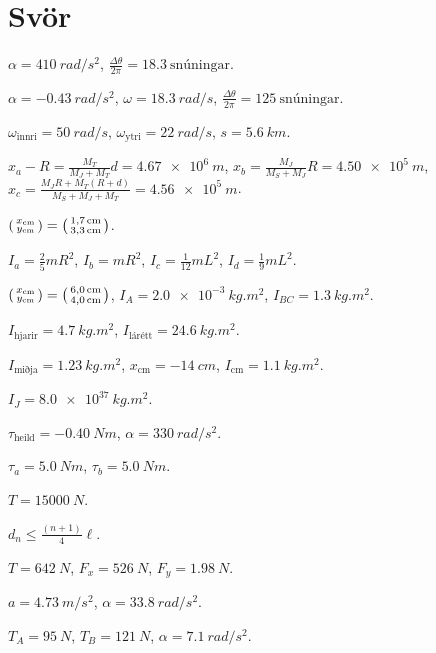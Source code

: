\ifdefined \wholebook \else\documentclass[oneside]{book}\usepackage{EdlBook}\graphicspath{{figures/}}
\begin{document}
\section*{Svör}

\begin{enumerate*}[label = \vspace{0.15cm} \textbf{(\arabic*)}]
  \item $\alpha = \SI{410}{rad/s^2}$, $\frac{\Delta \theta}{2\pi} = \SI{18.3}{\text{snúningar}}$.
  \item $\alpha = \SI{-0.43}{rad/s^2}$, $\omega = \SI{18.3}{rad/s}$, $\frac{\Delta \theta}{2\pi} = \SI{125}{\text{snúningar}}$.
  \item $\omega_{\text{innri}} = \SI{50}{rad/s}$, $\omega_{\text{ytri}} = \SI{22}{rad/s}$, $s = \SI{5.6}{km}$.
  \item $x_a - R = \frac{M_T}{M_J + M_T}d = \SI{4.67e6}{m}$, $x_b = \frac{M_J}{M_S + M_J}R = \SI{4.50e5}{m}$, $x_c = \frac{M_J R + M_T (R+d)}{M_S + M_J + M_T} = \SI{4.56e5}{m}$.
  \item $\smqty(x_{\text{cm}} \\ y_{\text{cm}}) = \smqty(\SI{1.7}{cm} \\ \SI{3.3}{cm})$. \item $I_a = \frac{2}{5}mR^2$, $I_b = mR^2$, $I_c = \frac{1}{12}mL^2$, $I_d = \frac{1}{9}mL^2$.
  \item $\smqty(x_{\text{cm}} \\ y_{\text{cm}}) = \smqty(\SI{6.0}{cm} \\ \SI{4.0}{cm})$, $I_A = \SI{2.0e-3}{kg.m^2}$, $I_{BC} = \SI{1.3}{kg.m^2}$.
  \item $I_{\text{hjarir}} = \SI{4.7}{kg.m^2}$, $I_{\text{lárétt}} = \SI{24.6}{kg.m^2}$.
  \item $I_{\text{miðja}} = \SI{1.23}{kg.m^2}$, $x_{\text{cm}} = \SI{-14}{cm}$, $I_{\text{cm}} = \SI{1.1}{kg.m^2}$.
  \item $I_J = \SI{8.0e37}{kg.m^2}$.
  \item $\tau_{\text{heild}} = \SI{-0.40}{Nm}$, $\alpha = \SI{330}{rad/s^2}$.
  \item $\tau_a = \SI{5.0}{Nm}$, $\tau_b = \SI{5.0}{Nm}$. \item $T = \SI{15000}{N}$. 
  \item $d_n \leq \frac{(n+1)}{4}\ell$.
  \item $T = \SI{642}{N}$, $F_x = \SI{526}{N}$, $F_y = \SI{1.98}{N}$.
  \item $a = \SI{4.73}{m/s^2}$, $\alpha = \SI{33.8}{rad/s^2}$.
  \item $T_A = \SI{95}{N}$, $T_B = \SI{121}{N}$, $\alpha = \SI{7.1}{rad/s^2}$.

\end{enumerate*}
\end{document}
